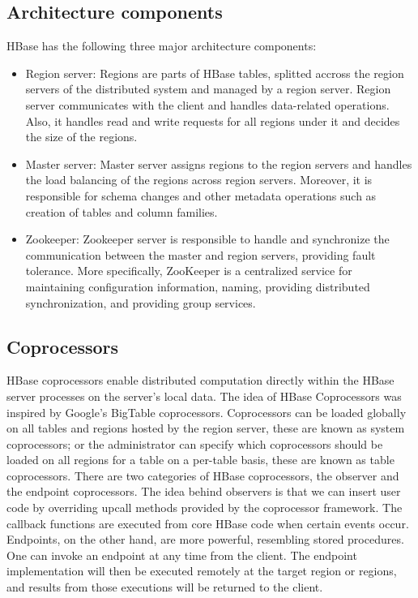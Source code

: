 \subsection{Architecture components}

HBase has the following three major architecture components:

\begin{itemize}
 \item Region server: Regions are parts of HBase tables, splitted accross the region servers of the distributed system and managed by a region server. 
 Region server communicates with the client and handles data-related operations. Also, it handles read and write requests for all regions under it and decides 
 the size of the regions.
 \item Master server: Master server assigns regions to the region servers and handles the load balancing of the regions across region servers. Moreover, it is 
 responsible for schema changes and other metadata operations such as creation of tables and column families. 
 \item Zookeeper: Zookeeper server is responsible to handle and synchronize the communication between the master and region servers, providing 
 fault tolerance. More specifically, ZooKeeper is a centralized service for maintaining configuration information, naming, providing distributed 
 synchronization, and providing group services.
\end{itemize}

\subsection{Coprocessors}

HBase coprocessors enable distributed computation directly within the HBase server processes on the server's local data.
The idea of HBase Coprocessors was inspired by Google’s BigTable coprocessors. Coprocessors can be loaded globally on all tables and regions hosted 
by the region server, these are known as system coprocessors; or the administrator can specify which coprocessors should be loaded on all regions for a table on 
a per-table basis, these are known as table coprocessors. There are two categories of HBase coprocessors, the observer and the 
endpoint coprocessors. The idea behind observers is that we can insert user code by overriding upcall methods provided by the coprocessor framework. 
The callback functions are executed from core HBase code when certain events occur. 
Endpoints, on the other hand, are more powerful, resembling stored procedures. One can invoke an endpoint at any time from the client. The endpoint implementation 
will then be executed remotely at the target region or regions, and results from those executions will be returned to the client. \\

